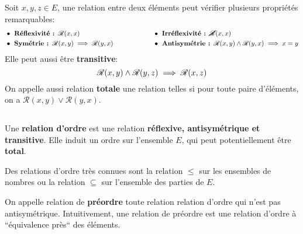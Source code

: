 \subsection*{}

Soit \(x, y, z \in E\), une relation entre deux éléments peut vérifier plusieurs propriétés remarquables:
\[
    \begin{aligned}
        &\bullet \textbf{ Réflexivité : } \mathscr{R}(x, x)\\
        &\bullet \textbf{ Symétrie : } \mathscr{R}(x, y) \implies \mathscr{R}(y, x)\\
    \end{aligned}
    \hspace{60pt}
    \begin{aligned}
        &\bullet \textbf{ Irréflexivité : } \cancel{\mathscr{R}}(x, x)\\
        &\bullet \textbf{ Antisymétrie : } \mathscr{R}(x, y) \land \mathscr{R}(y, x) \implies x = y \\
    \end{aligned}
\]
Elle peut aussi être \textbf{transitive}:
\[
    \mathscr{R}(x, y) \land \mathscr{R}(y, z) \implies \mathscr{R}(x, z)\\
\]
On appelle aussi relation \textbf{totale} une relation telles si pour toute paire d'éléments, on a \(\mathscr{R}(x, y) \lor \mathscr{R}(y, x)\).
\pagebreak

\subsection*{}

Une \textbf{relation d'ordre} est une relation \textbf{réflexive, antisymétrique et transitive}. Elle induit un ordre sur l'ensemble \(E\), qui peut potentiellement être \textbf{total}.\<

Des relations d'ordre très connues sont la relation \(\leq\) sur les ensembles de nombres ou la relation \(\subseteq\) sur l'ensemble des parties de \(E\).\<

On appelle relation de \textbf{préordre} toute relation relation d'ordre qui n'est pas antisymétrique. Intuitivement, une relation de préordre est une relation d'ordre à ``équivalence près`` des éléments.

\subsection*{}

